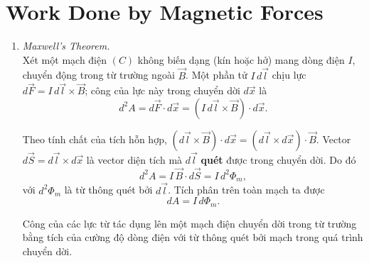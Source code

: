 \section{Work Done by Magnetic Forces}
\begin{enumerate}
\item \textit{Maxwell's Theorem.}\\
Xét một mạch điện $(C)$ không biến dạng (kín hoặc hở) mang dòng điện $I$, chuyển động trong từ trường ngoài $\vec{B}$. Một phần tử $I\,d\vec{l}$ chịu lực $d\vec{F} = I\,d\vec{l} \times \vec{B}$; công của lực này trong chuyển dời $d\vec{x}$ là
\[
d^2A = d\vec{F}\cdot d\vec{x} = (I\,d\vec{l} \times \vec{B})\cdot d\vec{x}.
\]
\begin{figure}[htbp]
    \centering
\end{figure}
Theo tính chất của tích hỗn hợp, $(d\vec{l} \times \vec{B})\cdot d\vec{x} = (d\vec{l} \times d\vec{x})\cdot\vec{B}$. Vector $d\vec{S} = d\vec{l} \times d\vec{x}$ là vector diện tích mà $d\vec{l}$ \textbf{quét} được trong chuyển dời. Do đó
\[
d^2A = I\,\vec{B}\cdot d\vec{S} = I\,d^2\Phi_m,
\]
với $d^2\Phi_m$ là từ thông quét bởi $d\vec{l}$. Tích phân trên toàn mạch ta được
\[
dA = I\,d\Phi_m.
\]
\begin{theorem}[Maxwell]
Công của các lực từ tác dụng lên một mạch điện chuyển dời trong từ trường bằng tích của cường độ dòng điện với từ thông quét bởi mạch trong quá trình chuyển dời.
\end{theorem}


\end{enumerate}
